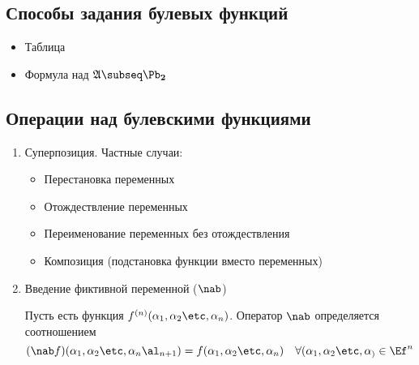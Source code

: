 \documentclass[unicode,10pt]{article}
\begin{document}
\subsection{Способы задания булевых функций}
\begin{itemize}
 \item Таблица
 \item Формула над $\ag\subseq\PD$
\end{itemize}
\subsection{Операции над булевскими функциями}
\begin{enumerate}
  \item Суперпозиция. Частные случаи:
    \begin{itemize}
      \item Перестановка переменных
      \item Отождествление переменных
      \item Переименование переменных без отождествления
      \item Композиция (подстановка функции вместо переменных)
    \end{itemize}
  \item Введение фиктивной переменной ($\nab$)
    \begin{df}
      Пусть есть функция $f^{(n)}(\set{n})$. Оператор $\nab$ определяется соотношением
      \begin{displaymath}
        (\nab f)(\set{n}\al_{n+1})=f(\set{n})  \quad \forall (\set) \in \Ef^n
      \end{displaymath}
    \end{df}
\end{enumerate}
\end{document}
